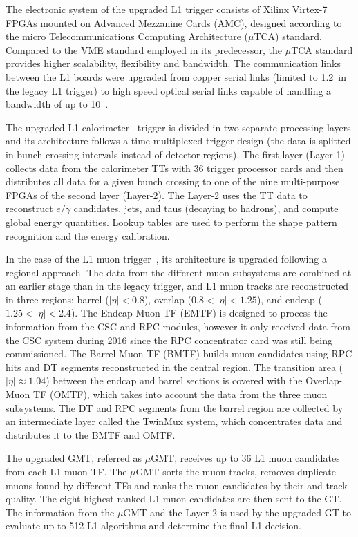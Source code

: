 The electronic system of the upgraded L1 trigger consists of Xilinx Virtex-7 FPGAs mounted on Advanced Mezzanine Cards (AMC), designed according to the micro Telecommunications Computing Architecture ($\mu$TCA) standard. Compared to the VME standard employed in its predecessor, the $\mu$TCA standard provides higher scalability, flexibility and bandwidth. The communication links between the L1 boards were upgraded from copper serial links (limited to 1.2~\Gbs in the legacy L1 trigger) to high speed optical serial links capable of handling a bandwidth of up to 10~\Gbs.

The upgraded L1 calorimeter~\cite{Stage2L1Calorimeter} trigger is divided in two separate processing layers and its architecture follows a time-multiplexed trigger design (the data is splitted in bunch-crossing intervals instead of detector regions). The first layer (Layer-1) collects data from the calorimeter TTs with 36 trigger processor cards and then distributes all data for a given bunch crossing to one of the nine multi-purpose FPGAs of the second layer (Layer-2). The Layer-2 uses the TT data to reconstruct $e/\gamma$ candidates, jets, and taus  (decaying to hadrons), and compute global energy quantities. Lookup tables are used to perform the shape pattern recognition and the energy calibration.

In the case of the L1 muon trigger~\cite{Stage2L1Muon}, its architecture is upgraded following a regional  approach. The data from the different muon subsystems are combined at an earlier stage than in the legacy trigger, and L1 muon tracks are reconstructed in three regions: barrel ($|\eta| < 0.8$), overlap ($0.8 < |\eta| < 1.25$), and endcap ($1.25 < |\eta| < 2.4$). The Endcap-Muon TF (EMTF) is designed to process the information from the CSC and RPC modules, however it only received data from the CSC system during 2016 since the RPC concentrator card was still being commissioned. The Barrel-Muon TF (BMTF) builds muon candidates using RPC hits and DT segments reconstructed in the central region. The transition area ($|\eta| \approx 1.04$) between the endcap and barrel sections is covered with the Overlap-Muon TF (OMTF), which takes into account the data from the three muon subsystems. The DT and RPC segments from the barrel region are collected by an intermediate layer called the TwinMux system, which concentrates data and distributes it to the BMTF and OMTF.

The upgraded GMT, referred as $\mu$GMT, receives up to 36 L1 muon candidates from each L1 muon TF. The $\mu$GMT sorts the muon tracks, removes duplicate muons found by different TFs and ranks the muon candidates by their \pt and track quality. The eight highest ranked L1 muon candidates are then sent to the GT. The information from the $\mu$GMT and the Layer-2 is used by the upgraded GT to evaluate up to 512 L1 algorithms and determine the final L1 decision.

